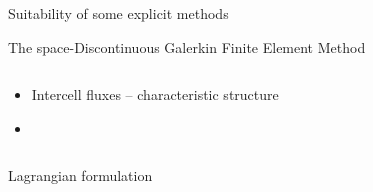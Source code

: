 \begin{withoutheadline}
\begin{frame}{Suitability of some explicit methods}
\begin{block}{The space-Discontinuous Galerkin Finite Element Method \cite{Cockburn}}
\begin{overprint}
\begin{columns}
\begin{footnotesize}
\begin{column}{0.6\textwidth}
              \begin{itemize}
              \item[] Intercell fluxes -- characteristic structure
              \item[] %
              \end{itemize}
            \end{column}
          \end{footnotesize}
        \end{columns}
        \vskip -10pt
        \begin{columns}
          \begin{column}{0.48\textwidth}
            \begin{block}{\footnotesize Lagrangian formulation \cite{LagrangianDG_thesis}}
              \centering
            \end{block}
          \end{column}
          \begin{column}{0.48\textwidth}
            

\end{column}
\end{columns}
\end{overprint}
\end{block}
\end{frame}
\end{withoutheadline}
